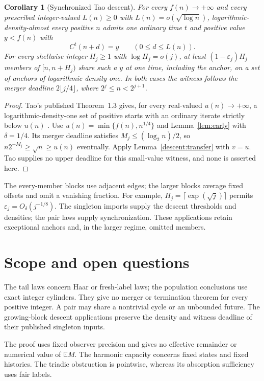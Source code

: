 \documentclass[11pt]{amsart}
\newtheorem{corollary}[theorem]{Corollary}
\theoremstyle{definition}
\theoremstyle{remark}
\newcommand{\E}{\mathbb E}
\begin{document}
\begin{corollary}[Synchronized Tao descent]\label{thm:window}\label{descent:majority-tao}
For every $f(n)\to+\infty$ and every prescribed integer-valued $L(n)\ge0$
with $L(n)=o(\sqrt{\log n})$, logarithmic-density-almost every positive $n$
admits one ordinary time $t$ and positive value $y<f(n)$ with
\[
 C^t(n+d)=y\qquad(0\le d\le L(n)).
\]
For every shellwise integer $H_j\ge1$ with $\log H_j=o(j)$, at least
$(1-\varepsilon_j)H_j$ members of $[n,n+H_j)$ share such a $y$ at one
time, including the anchor, on a set of anchors of logarithmic density one.
In both cases the witness follows the merger deadline
$2\lfloor j/4\rfloor$, where $2^j\le n<2^{j+1}$.
\end{corollary}
\begin{proof}
Tao's published Theorem~1.3 gives, for every real-valued $u(n)\to+\infty$,
a logarithmic-density-one set of positive starts with an ordinary iterate
strictly below $u(n)$ \cite{Tao2022}. Use
$u(n)=\min\{f(n),n^{1/4}\}$ and Lemma~\ref{lem:early} with $\delta=1/4$.
Its merger deadline satisfies $M_j\le(\log_2n)/2$, so
$n2^{-M_j}\ge\sqrt n\ge u(n)$ eventually. Apply
Lemma~\ref{descent:transfer} with $v=u$. Tao supplies no upper deadline
for this small-value witness, and none is asserted here.
\end{proof}

The every-member blocks use adjacent edges; the larger blocks average
fixed offsets and omit a vanishing fraction. For example,
$H_j=\lceil\exp(\sqrt j)\rceil$ permits $\varepsilon_j=O_\delta(j^{-1/8})$.
The singleton imports supply the descent thresholds and densities;
the pair laws supply synchronization. These applications retain exceptional
anchors and, in the larger regime, omitted members.

\section{Scope and open questions}\label{sec:scope}
The tail laws concern Haar or fresh-label laws; the population conclusions
use exact integer cylinders. They give no merger or termination theorem
for every positive integer. A pair may share a nontrivial cycle or an
unbounded future. The growing-block descent applications preserve the
density and witness deadline of their published singleton inputs.

The proof uses fixed observer precision and gives no effective remainder
or numerical value of $\E M$. The harmonic capacity concerns fixed states
and fixed histories. The triadic obstruction is pointwise, whereas its
absorption sufficiency uses fair labels.
\end{document}
